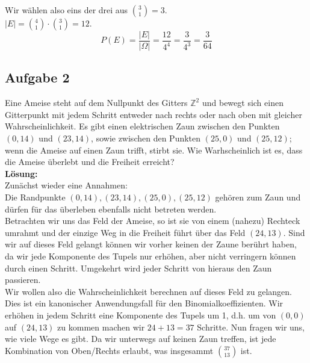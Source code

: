 \documentclass[11pt,a4paper,ngerman]{article}
\begin{document}
Wir wählen also eins der drei aus $\binom{3}{1} = 3$.\\

$\left|E\right| = \binom{4}{1} \cdot \binom{3}{1} = 12$.\\

\[
    P(E) = \frac{\left|E\right|}{\left|\Omega\right|} = \frac{12}{4^4} = \frac{3}{4^3} = \frac{3}{64}
\]

\subsection*{Aufgabe 2}

Eine Ameise steht auf dem Nullpunkt des Gitters $\mathbb{Z}^2$ und bewegt sich einen Gitterpunkt mit jedem Schritt entweder nach rechts oder nach
oben mit gleicher Wahrscheinlichkeit. Es gibt einen elektrischen Zaun zwischen den Punkten $(0,14)$ und $(23,14)$, sowie zwischen den Punkten $(25,0)$ und
$(25,12)$; wenn die Ameise auf einen Zaun trifft, stirbt sie. Wie Warhscheinlich ist es, dass die Ameise überlebt und die Freiheit erreicht?\\

\textbf{Lösung:}\\

Zunächst wieder eine Annahmen:\\
Die Randpunkte $(0,14), (23,14), (25,0), (25,12)$ gehören zum Zaun und dürfen für das überleben ebenfalls nicht betreten werden.\\

Betrachten wir uns das Feld der Ameise, so ist sie von einem (nahezu) Rechteck umrahmt und der einzige Weg in die Freiheit führt über
das Feld $(24,13)$. Sind wir auf dieses Feld gelangt können wir vorher keinen der Zaune berührt haben, da wir jede Komponente des Tupels nur erhöhen,
aber nicht verringern können durch einen Schritt.
Umgekehrt wird jeder Schritt von hieraus den Zaun passieren.\\

Wir wollen also die Wahrscheinlichkeit berechnen auf dieses Feld zu gelangen.\\
Dies ist ein kanonischer Anwendungsfall für den Binomialkoeffizienten. Wir erhöhen in jedem Schritt eine Komponente des Tupels um 1, d.h.
um von $(0,0)$ auf $(24,13)$ zu kommen machen wir $24+13 = 37$ Schritte. Nun fragen wir uns, wie viele Wege es gibt.
Da wir unterwegs auf keinen Zaun treffen, ist jede Kombination von Oben/Rechts erlaubt, was insgesammt
$ \binom{37}{13} $ ist.\\
\end{document}
